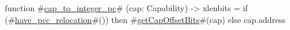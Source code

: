 function #\hyperref[sailRISCVzcapzytozyintegerzypc]{cap\_to\_integer\_pc}# (cap: Capability) -> xlenbits = {
  if (#\hyperref[sailRISCVzhavezypcczyrelocation]{have\_pcc\_relocation}#()) then #\hyperref[sailRISCVzgetCapOffsetBits]{getCapOffsetBits}#(cap) else cap.address
}
